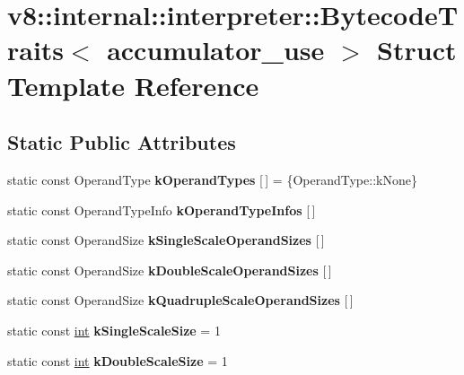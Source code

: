 \hypertarget{structv8_1_1internal_1_1interpreter_1_1BytecodeTraits_3_01accumulator__use_01_4}{}\section{v8\+:\+:internal\+:\+:interpreter\+:\+:Bytecode\+Traits$<$ accumulator\+\_\+use $>$ Struct Template Reference}
\label{structv8_1_1internal_1_1interpreter_1_1BytecodeTraits_3_01accumulator__use_01_4}
\subsection*{Static Public Attributes}
\begin{DoxyCompactItemize}
\item 
\mbox{\label{structv8_1_1internal_1_1interpreter_1_1BytecodeTraits_3_01accumulator__use_01_4_a4da796d46986e7c91e8ac31d232acadb}} 
static const Operand\+Type {\bfseries k\+Operand\+Types} \mbox{[}$\,$\mbox{]} = \{Operand\+Type\+::k\+None\}
\item 
static const Operand\+Type\+Info {\bfseries k\+Operand\+Type\+Infos} \mbox{[}$\,$\mbox{]}
\item 
static const Operand\+Size {\bfseries k\+Single\+Scale\+Operand\+Sizes} \mbox{[}$\,$\mbox{]}
\item 
static const Operand\+Size {\bfseries k\+Double\+Scale\+Operand\+Sizes} \mbox{[}$\,$\mbox{]}
\item 
static const Operand\+Size {\bfseries k\+Quadruple\+Scale\+Operand\+Sizes} \mbox{[}$\,$\mbox{]}
\item 
\mbox{\label{structv8_1_1internal_1_1interpreter_1_1BytecodeTraits_3_01accumulator__use_01_4_a7a369ebd59de277db2fb3498c851b132}} 
static const \mbox{\hyperlink{classint}{int}} {\bfseries k\+Single\+Scale\+Size} = 1
\item 
\mbox{\label{structv8_1_1internal_1_1interpreter_1_1BytecodeTraits_3_01accumulator__use_01_4_a0cc56efeb3186b5d5ca7208151a7390f}} 
static const \mbox{\hyperlink{classint}{int}} {\bfseries k\+Double\+Scale\+Size} = 1

\end{DoxyCompactItemize}
